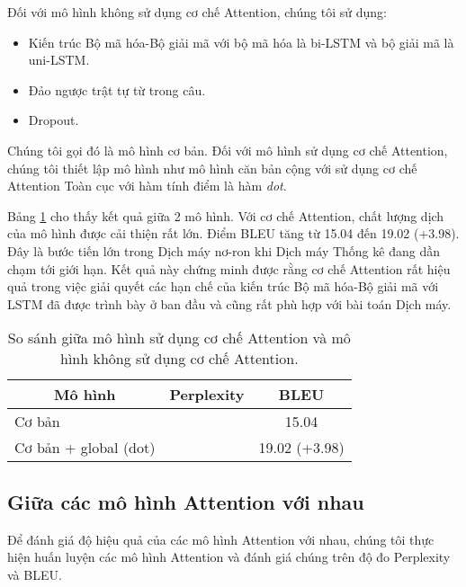Đối với mô hình không sử dụng cơ chế Attention, chúng tôi sử dụng: 
\begin{itemize}
	\item Kiến trúc Bộ mã hóa-Bộ giải mã với bộ mã hóa là bi-LSTM và bộ giải mã là uni-LSTM.
	\item Đảo ngược trật tự từ trong câu.
	\item Dropout.
\end{itemize}
Chúng tôi gọi đó là mô hình cơ bản. Đối với mô hình sử dụng cơ chế Attention, chúng tôi thiết lập mô hình như mô hình căn bản cộng với sử dụng cơ chế Attention Toàn cục với hàm tính điểm là hàm \textit{dot}.

Bảng \ref{tab_non-attn_vs_attn} cho thấy kết quả giữa 2 mô hình. Với cơ chế Attention, chất lượng dịch của mô hình được cải thiện rất lớn. Điểm BLEU tăng từ 15.04 đến 19.02 (+3.98). Đây là bước tiến lớn trong Dịch máy nơ-ron khi Dịch máy Thống kê đang dần chạm tới giới hạn. Kết quả này chứng minh được rằng cơ chế Attention rất hiệu quả trong việc giải quyết các hạn chế của kiến trúc Bộ mã hóa-Bộ giải mã với LSTM đã được trình bày ở ban đầu và cũng rất phù hợp với bài toán Dịch máy.

\begin{table}
	\centering
	\begin{tabular}{|l|l|c|} 
		\hline
		\multicolumn{1}{|c|}{\textbf{Mô hình}} & \textbf{Perplexity} & \textbf{BLEU}  \\ 
		\hline
		Cơ bản                                 &                     & 15.04          \\ 
		\hline
		Cơ bản + global (dot)                  &                     & 19.02 (+3.98)  \\
		\hline
	\end{tabular}
	\caption{So sánh giữa mô hình sử dụng cơ chế Attention và mô hình không sử dụng cơ chế Attention.}
	\label{tab_non-attn_vs_attn}
\end{table}

\subsection{Giữa các mô hình Attention với nhau}
Để đánh giá độ hiệu quả của các mô hình Attention với nhau, chúng tôi thực hiện huấn luyện các mô hình Attention và đánh giá chúng trên độ đo Perplexity và BLEU. 



